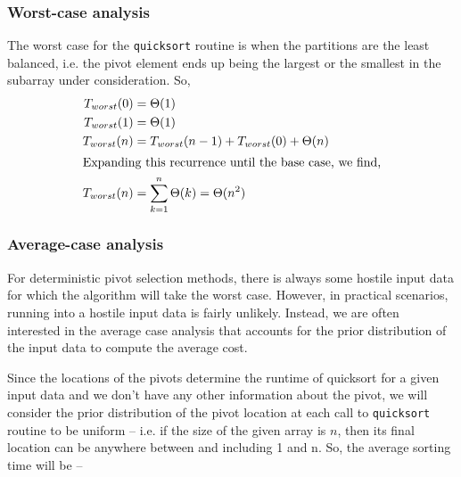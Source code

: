\documentclass[]{finalproject}
\begin{document}
\subsubsection{Worst-case analysis}

The worst case for the \texttt{quicksort} routine is when the partitions are the least balanced, i.e. the pivot element ends up being the largest or the smallest in the subarray under consideration. So,
\begin{align*}
T_{worst}(0) &= \Theta(1) \\
T_{worst}(1) &= \Theta(1) \\
T_{worst}(n) &= T_{worst}(n-1) + T_{worst}(0) + \Theta(n) \\
\shortintertext{Expanding this recurrence until the base case, we find,}
T_{worst}(n) &= \sum_{k=1}^n\Theta(k) = \Theta(n^2)
\end{align*}

\subsubsection{Average-case analysis}

For deterministic pivot selection methods, there is always some hostile input data for which the algorithm will take the worst case. However, in practical scenarios, running into a hostile input data is fairly unlikely. Instead, we are often interested in the average case analysis that accounts for the prior distribution of the input data to compute the average cost.

Since the locations of the pivots determine the runtime of quicksort for a given input data and we don't have any other information about the pivot, we will consider the prior distribution of the pivot location at each call to \texttt{quicksort} routine to be uniform -- i.e. if the size of the given array is $n$, then its final location can be anywhere between and including 1 and n. So, the average sorting time will be --
\end{document}
